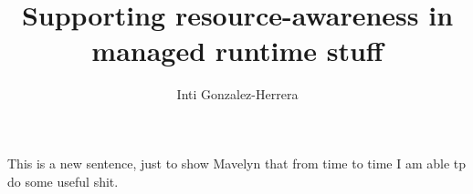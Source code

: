 \documentclass[11pt]{paper}
\title{Supporting resource-awareness in managed runtime stuff}
\author{Inti Gonzalez-Herrera}
\begin{document}
\maketitle


This is a new sentence, just to show Mavelyn that from time to time I am able tp do some useful shit.


\end{document}
